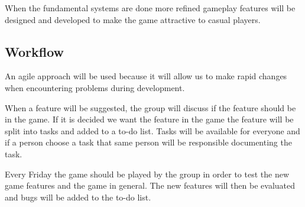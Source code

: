 When the fundamental systems are done more refined gameplay features will be designed and developed to make the game attractive to casual players.

\subsection{Workflow}
An agile approach will be used because it will allow us to make rapid changes when encountering problems during development.

When a feature will be suggested, the group will discuss if the feature should be in the game.
If it is decided we want the feature in the game the feature will be split into tasks and added to a to-do list.
Tasks will be available for everyone and if a person choose a task that same person will be responsible documenting the task.

Every Friday the game should be played by the group in order to test the new game features and the game in general.
The new features will then be evaluated and bugs will be added to the to-do list.
